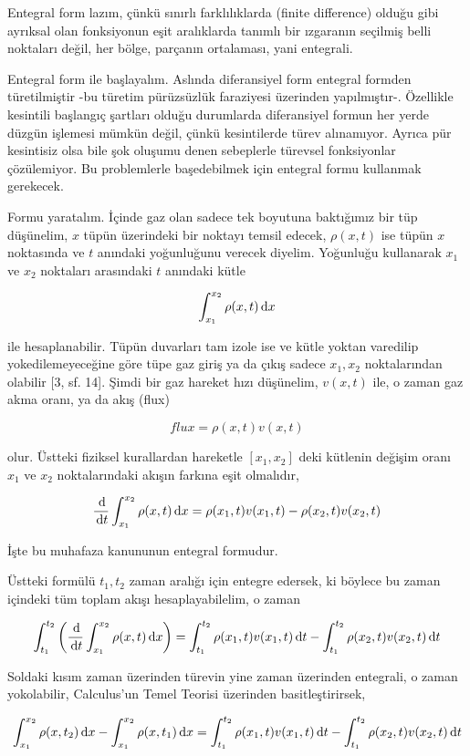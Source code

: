 \documentclass[12pt,fleqn]{article}\usepackage{../../common}
\begin{document}
Entegral form lazım, çünkü sınırlı farklılıklarda (finite difference) olduğu
gibi ayrıksal olan fonksiyonun eşit aralıklarda tanımlı bir ızgaranın seçilmiş
belli noktaları değil, her bölge, parçanın ortalaması, yani entegrali.

Entegral form ile başlayalım. Aslında diferansiyel form entegral formden
türetilmiştir -bu türetim pürüzsüzlük faraziyesi üzerinden
yapılmıştır-. Özellikle kesintili başlangıç şartları olduğu durumlarda
diferansiyel formun her yerde düzgün işlemesi mümkün değil, çünkü kesintilerde
türev alınamıyor. Ayrıca pür kesintisiz olsa bile şok oluşumu denen sebeplerle
türevsel fonksiyonlar çözülemiyor. Bu problemlerle başedebilmek için entegral
formu kullanmak gerekecek.

Formu yaratalım. İçinde gaz olan sadece tek boyutuna baktığımız bir tüp
düşünelim, $x$ tüpün üzerindeki bir noktayı temsil edecek, $\rho(x,t)$ ise tüpün
$x$ noktasında ve $t$ anındaki yoğunluğunu verecek diyelim. Yoğunluğu kullanarak
$x_1$ ve $x_2$ noktaları arasındaki $t$ anındaki kütle

$$
\int _{x_1}^{x_2} \rho(x,t) \,\mathrm{d} x
$$

ile hesaplanabilir. Tüpün duvarları tam izole ise ve kütle yoktan varedilip
yokedilemeyeceğine göre tüpe gaz giriş ya da çıkış sadece $x_1,x_2$
noktalarından olabilir [3, sf. 14]. Şimdi bir gaz hareket hızı düşünelim,
$v(x,t)$ ile, o zaman gaz akma oranı, ya da akış (flux)

$$
flux = \rho(x,t) v(x,t)
$$

olur. Üstteki fiziksel kurallardan hareketle $[x_1,x_2]$ deki kütlenin
değişim oranı $x_1$ ve $x_2$ noktalarındaki akışın farkına eşit olmalıdır,

$$
\frac{\,\mathrm{d}}{\,\mathrm{d} t} \int _{x_1}^{x_2} \rho(x,t) \,\mathrm{d} x =
\rho(x_1,t) v(x_1,t) - \rho(x_2,t) v(x_2,t)
$$

İşte bu muhafaza kanununun entegral formudur. 

Üstteki formülü $t_1,t_2$ zaman aralığı için entegre edersek, ki böylece
bu zaman içindeki tüm toplam akışı hesaplayabilelim, o zaman

$$
\int_{t_1}^{t_2} \left( \frac{\,\mathrm{d}}{\,\mathrm{d} t} \int _{x_1}^{x_2} \rho(x,t) \,\mathrm{d} x  \right)  =
\int_{t_1}^{t_2} \rho(x_1,t) v(x_1,t) \,\mathrm{d} t -
\int_{t_1}^{t_2} \rho(x_2,t) v(x_2,t) \,\mathrm{d} t
$$

Soldaki kısım zaman üzerinden türevin yine zaman üzerinden entegrali, o zaman
yokolabilir, Calculus'un Temel Teorisi üzerinden basitleştirirsek,

$$
\int _{x_1}^{x_2} \rho(x,t_2) \,\mathrm{d} x -
\int _{x_1}^{x_2} \rho(x,t_1) \,\mathrm{d} x  = 
\int_{t_1}^{t_2} \rho(x_1,t) v(x_1,t) \,\mathrm{d} t -
\int_{t_1}^{t_2}  \rho(x_2,t) v(x_2,t) \,\mathrm{d} t
$$
\end{document}
